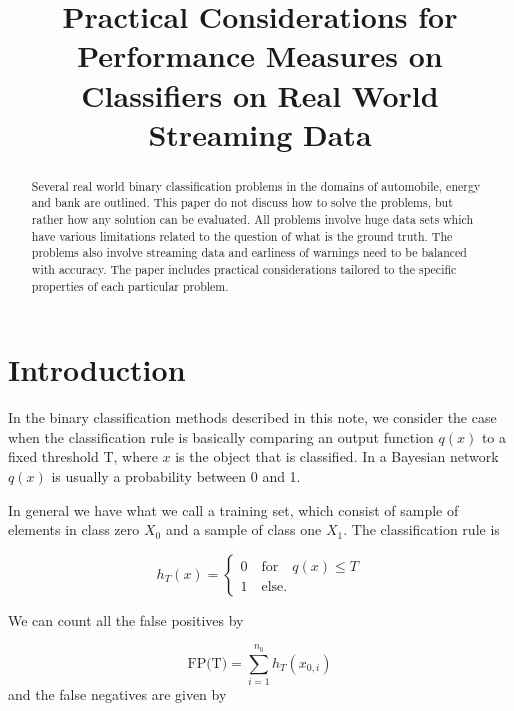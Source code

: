 \documentclass{article}
\title{Practical Considerations for Performance Measures on Classifiers on Real World Streaming Data}
\date{}
\theoremstyle{theorem}
\theoremstyle{definition}
\begin{document}
\maketitle

\begin{abstract}
Several real world binary classification problems in the domains of automobile, energy and bank are outlined.  This paper do not discuss how to solve the problems, but rather how any solution can be evaluated.  All problems involve huge data sets which have various limitations related to the question of what is the ground truth. The problems also involve streaming data and earliness of warnings need to be balanced with accuracy. The paper includes practical considerations tailored to the specific properties of each particular problem.
\end{abstract}

\section{Introduction}

In the binary classification methods described in this note, we consider the case when the classification rule is basically comparing an output function $q(x)$ to a fixed threshold T, where $x$ is the object that is classified.  In a Bayesian network $q(x)$ is usually a probability between 0 and 1. 

In general we have what we call a training set, which consist of sample of elements in class zero $X_0$ and a sample of class one $X_1$.  The classification rule is 

\begin{equation}
\label{eq:ht}
h_T(x) = 
\begin{cases}
0 \quad \mbox{for} \quad q(x) \leq T\\
1 \quad \mbox{else}.
\end{cases}
\end{equation}

We can count all the false positives by

\begin{equation}
\label{eq:fp}
\mbox{FP(T)} = \sum_{i= 1}^{n_0} h_T(x_{0,i}) 
\end{equation}
and the false negatives are given by
\end{document}
